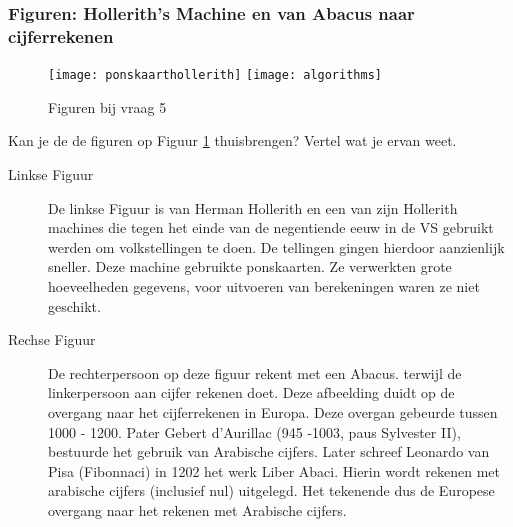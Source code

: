 \documentclass[../main.tex]{subfiles}
\begin{document}
\subsubsection{Figuren: Hollerith's Machine en van Abacus naar cijferrekenen}

\begin{figure}[ht!]
	\begin{center}
		\texttt{[image: ponskaarthollerith]}
		\texttt{[image: algorithms]}
	\end{center}
	\caption{Figuren bij vraag 5}
	\label{fig:vraag5}
\end{figure}

\begin{question}
Kan je de de figuren op Figuur \ref{fig:vraag5} thuisbrengen? Vertel wat je ervan weet.
\end{question}
\begin{description}
	\item[Linkse Figuur] De linkse Figuur is van Herman Hollerith en een van zijn Hollerith machines die tegen het einde van de negentiende eeuw in de VS gebruikt werden om volkstellingen te doen. De tellingen gingen hierdoor aanzienlijk sneller.
	 Deze machine gebruikte ponskaarten. Ze verwerkten grote hoeveelheden gegevens, voor uitvoeren van berekeningen waren ze niet geschikt.
	\item[Rechse Figuur] De rechterpersoon op deze figuur rekent met een Abacus. terwijl de linkerpersoon aan cijfer rekenen doet. Deze afbeelding duidt op de overgang naar het cijferrekenen in Europa. Deze overgan gebeurde tussen 1000 - 1200. Pater Gebert d'Aurillac (945 -1003, paus Sylvester II), bestuurde het gebruik van Arabische cijfers. Later schreef Leonardo van Pisa (Fibonnaci) in 1202 het werk Liber Abaci. Hierin wordt rekenen met arabische cijfers (inclusief nul) uitgelegd. Het tekenende dus de Europese overgang naar het rekenen met Arabische cijfers.
\end{description}
\end{document}
